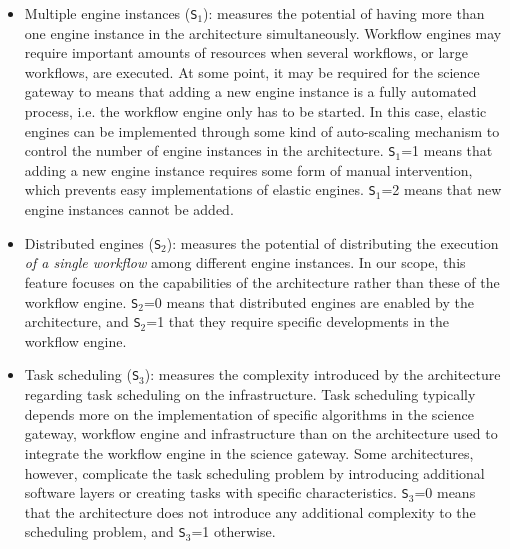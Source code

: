 \documentclass[preprint,3p,twocolumn]{elsarticle}
\newcommand{\note}[2]{\pdfmargincomment[color=yellow,author=#1,open=true]{#2}}
\newcommand{\closednote}[4]{} %
\begin{document}
\begin{itemize}[leftmargin=0cm,itemindent=0.35cm,itemsep=0cm]
\item Multiple engine instances (\texttt{S$_1$}): measures the potential \closednote{sil}{are we measuring possibility or potential? i think the second, because it is hypothetical. possibility brings me the idea of it is possible or not - which would be zero to almost all these features}{Tristan}{Fixed everywhere} of having
  more than one engine instance in the architecture simultaneously. Workflow engines
  may require important amounts of resources when several workflows,
  or large workflows, are executed. At some point, it may be required
  for the science gateway to means that adding a new engine instance is a
  fully automated process, i.e. the workflow engine only has to be
  started. In this case, elastic engines can be implemented through some kind
  of auto-scaling mechanism to control the number
  of engine instances in the architecture. \texttt{S$_1$}=1 means that
  adding a new engine instance requires some form of manual
  intervention, which prevents easy
  implementations of elastic engines. \texttt{S$_1$}=2 means that new engine
  instances cannot be added.
\item Distributed engines (\texttt{S$_2$}): measures the potential of distributing
  the execution \emph{of a single workflow} among different engine
  instances. In our scope, this feature focuses on the capabilities of
  the architecture rather than these of the workflow
  engine. \texttt{S$_2$}=0 means that distributed engines are enabled by
  the architecture, and \texttt{S$_2$}=1 that they require specific
  developments in the workflow engine.  \closednote{Rafael}{$S_2$
    would be 2 if the paradigm does not allow to distribute the
    orchestration? e.g., workflow executions implemented within MPI
    jobs, in Pegasus PMC and dispel4Py.}{Tristan}{The problem is that
    it is very difficult to define ``does not allow to''. For
    instance, why couldn't you hack Pegasus PMC so much that it
    becomes possible to distribute workflow executions in several MPI
    jobs coordinated by an MPI job? Moreover, S2=2 is not used so I'd
    prefer to leave it like this, unless you have a suggestion to
    reflect this in the text.}
\item Task scheduling (\texttt{S$_3$}): measures the complexity
  introduced by the architecture regarding task scheduling on
  the infrastructure. \closednote{sil}{need to be more specific about what
    is being called task scheduling here. also explain why it is
    difficult, or dont say anything if it is common knowledge}{Tristan}{OK, fixed.} Task
  scheduling typically depends more on the implementation of specific
  algorithms in the science gateway, workflow engine and
  infrastructure than on the architecture used to integrate the
  workflow engine in the science gateway. Some architectures, however,
  complicate the task scheduling problem by introducing additional
  software layers or creating tasks with specific
  characteristics. \texttt{S$_3$}=0 means that the architecture does
  not introduce any additional complexity to the scheduling problem,
  and \texttt{S$_3$}=1 otherwise.
\end{itemize}
\end{document}
